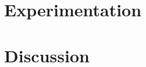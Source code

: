 \documentclass{article}
\begin{document}

\section{Experimentation}
\section{Discussion}
\end{document}
